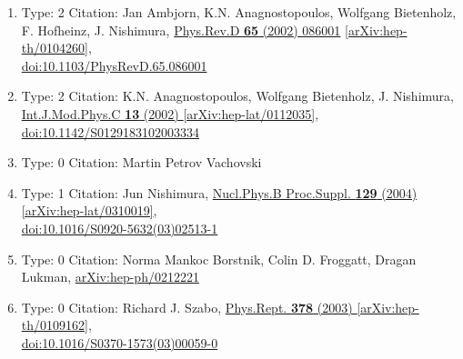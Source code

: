 \documentclass[a4paper,10pt]{article}
\begin{document}
\begin{enumerate}
\begin{enumerate}
  \item Type: 2 Citation: Jan Ambjorn, K.N. Anagnostopoulos, Wolfgang Bietenholz, F. Hofheinz, J. Nishimura, \href{https://www.doi.org/10.1103/PhysRevD.65.086001}{Phys.Rev.D {\bf 65} (2002) 086001}  \href{https://arxiv.org/abs/hep-th/0104260}{[arXiv:hep-th/0104260]},\\\href{https://www.doi.org/10.1103/PhysRevD.65.086001}{doi:10.1103/PhysRevD.65.086001}
  \item Type: 2 Citation: K.N. Anagnostopoulos, Wolfgang Bietenholz, J. Nishimura, \href{https://www.doi.org/10.1142/S0129183102003334}{Int.J.Mod.Phys.C {\bf 13} (2002) }  \href{https://arxiv.org/abs/hep-lat/0112035}{[arXiv:hep-lat/0112035]},\\\href{https://www.doi.org/10.1142/S0129183102003334}{doi:10.1142/S0129183102003334}
  \item Type: 0 Citation: Martin Petrov Vachovski
  \item Type: 1 Citation: Jun Nishimura, \href{https://www.doi.org/10.1016/S0920-5632(03)02513-1}{Nucl.Phys.B Proc.Suppl. {\bf 129} (2004) }  \href{https://arxiv.org/abs/hep-lat/0310019}{[arXiv:hep-lat/0310019]},\\\href{https://www.doi.org/10.1016/S0920-5632(03)02513-1}{doi:10.1016/S0920-5632(03)02513-1}
  \item Type: 0 Citation: Norma Mankoc Borstnik, Colin D. Froggatt, Dragan Lukman, \href{https://arxiv.org/abs/hep-ph/0212221}{arXiv:hep-ph/0212221}
  \item Type: 0 Citation: Richard J. Szabo, \href{https://www.doi.org/10.1016/S0370-1573(03)00059-0}{Phys.Rept. {\bf 378} (2003) }  \href{https://arxiv.org/abs/hep-th/0109162}{[arXiv:hep-th/0109162]},\\\href{https://www.doi.org/10.1016/S0370-1573(03)00059-0}{doi:10.1016/S0370-1573(03)00059-0}

\end{enumerate}
\end{enumerate}
\end{document}

